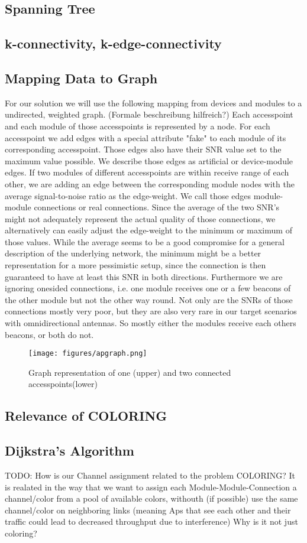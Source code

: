   \subsection{Spanning Tree}
  \subsection{k-connectivity, k-edge-connectivity}
  \subsection{Mapping Data to Graph}
    For our solution we will use the following mapping from devices and modules to a undirected, weighted graph. (Formale beschreibung hilfreich?)
    Each accesspoint and each module of those accesspoints is represented by a node.
    For each accesspoint we add edges with a special attribute "fake" to each module of its corresponding accesspoint. Those edges also have their SNR value set to 
    the maximum value possible. We describe those edges as artificial or device-module edges.
    If two modules of different accesspoints are within receive range of each other, 
    we are adding an edge between the corresponding module nodes with the average signal-to-noise ratio as the edge-weight.
    We call those edges module-module connections or real connections.
    Since the average of the two SNR's might not adequately represent the actual quality of those connections,
    we alternatively can easily adjust the edge-weight to the minimum or maximum of those values.
    While the average seems to be a good compromise for a general description of the underlying network, the minimum might be a better representation for 
    a more pessimistic setup, since the connection is then guaranteed to have at least this SNR in both directions. 
    Furthermore we are ignoring onesided connections, i.e. one module receives one or a few beacons of the other module but not the other way round.
    Not only are the SNRs of those connections mostly very poor, but they are also very rare in our target scenarios with omnidirectional antennas.
    So mostly either the modules receive each others beacons, or both do not.
    \begin{figure}[t]
      \centering
      \texttt{[image: figures/apgraph.png]}
      \caption{Graph representation of one (upper) and two connected accesspoints(lower)}
      \label{fig:apgraph}
    \end{figure}
    
  \subsection{Relevance of COLORING}
  \subsection{Dijkstra's Algorithm}
    TODO: How is our Channel assignment related to the problem COLORING?
    It is realated in the way that we want to assign each Module-Module-Connection a channel/color from a pool of available colors, withouth (if possible) use the same channel/color on neighboring links (meaning Aps that see each other and their traffic could lead to decreased throughput due to interference)
    Why is it not just coloring?
